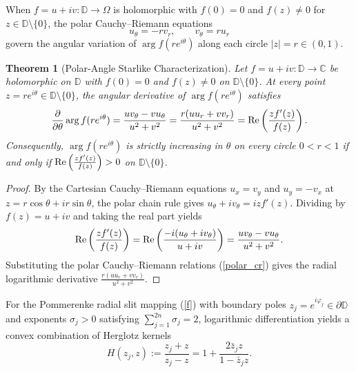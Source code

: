 \documentclass[11pt,reqno]{amsart}
\newtheorem{thm}{Theorem}[section]
\numberwithin{equation}{section}
\renewcommand{\phi}{\varphi}
\newcommand{\D}{\mathbb{D}}
\newcommand{\C}{\mathbb{C}}
\newcommand{\re}{\mbox{\rm Re\,}}
\begin{document}
When $f = u + iv : \D \to \varOmega$ is holomorphic with $f(0) = 0$ and $f(z) \ne 0$ for $z \in \D \setminus \{0\}$, the polar Cauchy--Riemann equations
\begin{equation} \label{polar_cr}
  u_\theta = -r v_r, \qquad v_\theta = r u_r
\end{equation}
govern the angular variation of $\arg f(re^{i\theta})$ along each circle $|z| = r \in (0, 1)$.

\begin{thm}[Polar-Angle Starlike Characterization] \label{thm_starlike_logderiv}
Let $f = u + iv : \D \to \C$ be holomorphic on $\D$ with $f(0) = 0$ and $f(z) \ne 0$ on $\D \setminus \{0\}$. At every point $z = r e^{i\theta} \in \D \setminus \{0\}$, the angular derivative of $\arg f(re^{i\theta})$ satisfies
\begin{equation} \label{eq_arg_polar_deriv}
  \frac{\partial}{\partial\theta}\arg f(re^{i\theta})
  = \frac{u v_\theta - v u_\theta}{u^2 + v^2}
  = \frac{r(u u_r + v v_r)}{u^2 + v^2}
  = \re\!\left(\frac{z f'(z)}{f(z)}\right).
\end{equation}
Consequently, $\arg f(re^{i\theta})$ is strictly increasing in $\theta$ on every circle $0 < r < 1$ if and only if $\re\!\left(\frac{z f'(z)}{f(z)}\right) > 0$ on $\D \setminus \{0\}$.
\end{thm}
\begin{proof}
By the Cartesian Cauchy--Riemann equations $u_x = v_y$ and $u_y = -v_x$ at $z = r\cos\theta + i r\sin\theta$, the polar chain rule gives $u_\theta + i v_\theta = i z f'(z)$. Dividing by $f(z) = u + iv$ and taking the real part yields
\[
  \re\!\left(\frac{z f'(z)}{f(z)}\right) = \re\!\left(\frac{-i(u_\theta + i v_\theta)}{u + iv}\right) = \frac{u v_\theta - v u_\theta}{u^2 + v^2}.
\]
Substituting the polar Cauchy--Riemann relations (\ref{polar_cr}) gives the radial logarithmic derivative $\frac{r(u u_r + v v_r)}{u^2 + v^2}$.
\end{proof}

For the Pommerenke radial slit mapping (\ref{f}) with boundary poles $z_j = e^{i\phi_j} \in \partial\D$ and exponents $\sigma_j > 0$ satisfying $\sum_{j=1}^{2n} \sigma_j = 2$, logarithmic differentiation yields a convex combination of Herglotz kernels
\begin{equation} \label{eq_herglotz_kernel}
  H(z_j, z) := \frac{z_j + z}{z_j - z} = 1 + \frac{2 \bar{z}_j z}{1 - \bar{z}_j z}.
\end{equation}
\end{document}
